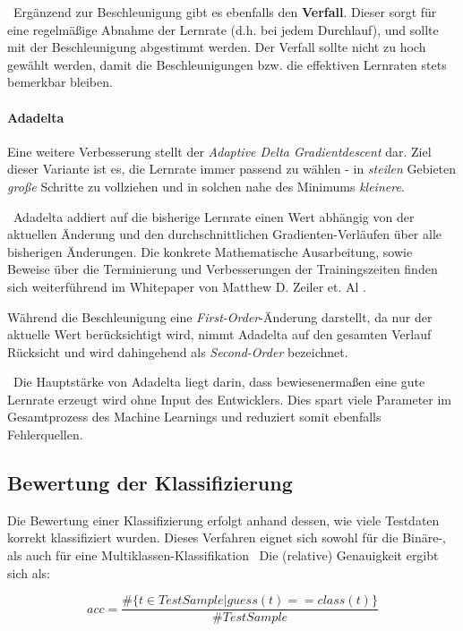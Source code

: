 ~\newline Ergänzend zur Beschleunigung gibt es ebenfalls den \textbf{Verfall}. Dieser sorgt für eine regelmäßige Abnahme der Lernrate (d.h. bei jedem Durchlauf), und sollte mit der Beschleunigung abgestimmt werden. Der Verfall sollte nicht zu hoch gewählt werden, damit die Beschleunigungen bzw. die effektiven Lernraten stets bemerkbar bleiben. 
\paragraph{Adadelta} Eine weitere Verbesserung stellt der \textit{Adaptive Delta Gradientdescent} dar. Ziel dieser Variante ist es, die Lernrate immer passend zu wählen - in \textit{steilen} Gebieten \textit{große} Schritte zu vollziehen und in solchen nahe des Minimums \textit{kleinere}.

~\newline Adadelta addiert auf die bisherige Lernrate einen Wert abhängig von der aktuellen Änderung und den durchschnittlichen Gradienten-Verläufen über alle bisherigen Änderungen. Die konkrete Mathematische Ausarbeitung, sowie Beweise über die Terminierung und Verbesserungen der Trainingszeiten finden sich weiterführend im Whitepaper von Matthew D. Zeiler et. Al \cite{AdaDelta}.

Während die Beschleunigung eine \textit{First-Order}-Änderung darstellt, da nur der aktuelle Wert berücksichtigt wird, nimmt Adadelta auf den gesamten Verlauf Rücksicht und wird dahingehend als \textit{Second-Order} bezeichnet. 

~\newline Die Hauptstärke von Adadelta liegt darin, dass bewiesenermaßen eine gute Lernrate erzeugt wird ohne Input des Entwicklers. Dies spart viele Parameter im Gesamtprozess des Machine Learnings und reduziert somit ebenfalls Fehlerquellen.
\subsection{Bewertung der Klassifizierung}
Die Bewertung einer Klassifizierung erfolgt anhand dessen, wie viele Testdaten korrekt klassifiziert wurden. Dieses Verfahren eignet sich sowohl für die Binäre-, als auch für eine Multiklassen-Klassifikation
~\newline Die (relative) Genauigkeit ergibt sich als: 

\begin{equation}
	acc = \dfrac{\#\{t \in  TestSample | guess(t)==class(t)\}}{\#TestSample}
\end{equation}